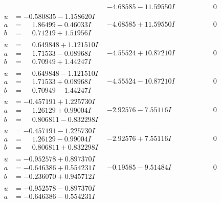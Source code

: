 \documentclass[1p]{elsarticle_modified}
\theoremstyle{definition}
\begin{document}
$$\begin{array}{c|c|c}
 & -4.68585 - 11.59550 I & \phantom{-0.000000 } 0 \\ \hline\begin{aligned}
u &= -0.580835 - 1.158620 I \\
a &= \phantom{-}1.86499 - 0.46033 I \\
b &= \phantom{-}0.71219 + 1.51956 I\end{aligned}
 & -4.68585 + 11.59550 I & \phantom{-0.000000 } 0 \\ \hline\begin{aligned}
u &= \phantom{-}0.649848 + 1.121510 I \\
a &= \phantom{-}1.71533 - 0.08968 I \\
b &= \phantom{-}0.70949 + 1.44247 I\end{aligned}
 & -4.55524 + 10.87210 I & \phantom{-0.000000 } 0 \\ \hline\begin{aligned}
u &= \phantom{-}0.649848 - 1.121510 I \\
a &= \phantom{-}1.71533 + 0.08968 I \\
b &= \phantom{-}0.70949 - 1.44247 I\end{aligned}
 & -4.55524 - 10.87210 I & \phantom{-0.000000 } 0 \\ \hline\begin{aligned}
u &= -0.457191 + 1.225730 I \\
a &= \phantom{-}1.26129 + 0.99004 I \\
b &= \phantom{-}0.806811 - 0.832298 I\end{aligned}
 & -2.92576 - 7.55116 I & \phantom{-0.000000 } 0 \\ \hline\begin{aligned}
u &= -0.457191 - 1.225730 I \\
a &= \phantom{-}1.26129 - 0.99004 I \\
b &= \phantom{-}0.806811 + 0.832298 I\end{aligned}
 & -2.92576 + 7.55116 I & \phantom{-0.000000 } 0 \\ \hline\begin{aligned}
u &= -0.952578 + 0.897370 I \\
a &= -0.646386 + 0.554231 I \\
b &= -0.236070 + 0.945712 I\end{aligned}
 & -0.19585 - 9.51484 I & \phantom{-0.000000 } 0 \\ \hline\begin{aligned}
u &= -0.952578 - 0.897370 I \\
a &= -0.646386 - 0.554231 I \\

\end{aligned}
\end{array}$$
\end{document}
